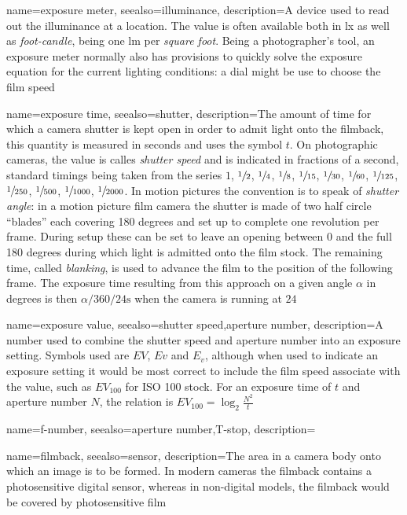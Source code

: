 {
	name={exposure meter},
	seealso={illuminance},
	description={A device used to read out the illuminance at a location. The value is often
		available both in \unit{\lux} as well as \textsl{foot-candle}, being one \unit{\lumen}
		per \textsl{square foot}. Being a photographer's tool, an exposure meter normally also
		has provisions to quickly solve the exposure equation for the current lighting
		conditions: a dial might be use to choose the film speed }
}

{
	name={exposure time},
	seealso={shutter},
	description={The amount of time for which a camera shutter is kept open in order to
		admit light onto the filmback, this quantity is measured in seconds and uses the
		symbol $t$. 
		On photographic cameras, the value is calles \textsl{shutter speed} and is 
		indicated in fractions of a second, standard timings being
		taken from the series $1$, $\sfrac12$, $\sfrac14$, $\sfrac18$, 
		$\sfrac1{15}$, $\sfrac1{30}$, $\sfrac1{60}$, $\sfrac1{125}$, 
		$\sfrac1{250}$, $\sfrac1{500}$, $\sfrac1{1000}$, $\sfrac1{2000}$.
		In motion pictures the convention is to speak of \textsl{shutter angle}:
		in a motion picture film camera the shutter is made of two half circle ``blades'' 
		each covering 180 degrees and set up to complete one revolution per frame. 
		During setup these can be set to leave an opening between 0 and the
		full 180 degrees during which light is admitted onto the film stock.
		The remaining time, called \textsl{blanking}, is used to advance the film
		to the position of the following frame. The exposure time resulting from this 
		approach on a given angle $\alpha$ in degrees is then $\alpha/360/24 \unit{\second}$
		when the camera is running at $24$ }
}

{
	name={exposure value},
	seealso={shutter speed,aperture number},
	description={A number used to combine the shutter speed and aperture number into an
		exposure setting. 
		Symbols used are $EV$, $Ev$ and $E_v$, although when used to indicate an exposure 
		setting it would be most correct to include the film speed associate with the value, 
		such as $EV_{100}$ for ISO 100 stock.
		For an exposure time of $t$ and aperture number $N$, the relation is
		$EV_{100} = \log_2\frac{N^2}{t}$}
}

{
	name={f-number},
	seealso={aperture number,T-stop},
	description=\nopostdesc
}

{
	name=filmback,
	seealso={sensor},
	description={The area in a camera body onto which an image is to be formed. 
		In modern cameras the filmback contains a photosensitive digital sensor,
		whereas in non-digital models, the filmback would be covered by 
		photosensitive film}
}

